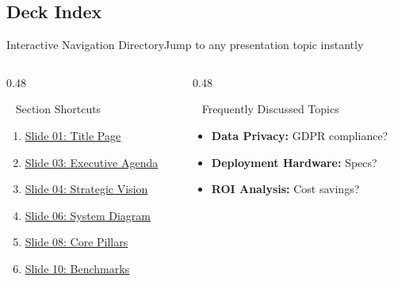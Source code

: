 \documentclass[aspectratio=169, 10pt]{beamer}
\newenvironment{compactitemize}{%
  \begin{itemize}%
    \setlength{\itemsep}{1pt}%
    \setlength{\parskip}{0pt}%
    \setlength{\parsep}{0pt}%
}{%
  \end{itemize}%
}
\begin{document}
\subsection{Deck Index}
\begin{frame}[label=deckindex]{Interactive Navigation Directory}{Jump to any presentation topic instantly}
  \begin{columns}[T]
    \begin{column}{0.48\textwidth}
      \begin{featurebox}{\faSitemap~ Section Shortcuts}
        \small
        \begin{enumerate}
          \item \hyperlink{titleframe}{\color{RoyalAccent} Slide 01: Title Page}
          \item \hyperlink{agenda}{\color{RoyalAccent} Slide 03: Executive Agenda}
          \item \hyperlink{sec:vision}{\color{RoyalAccent} Slide 04: Strategic Vision}
          \item \hyperlink{architecture}{\color{RoyalAccent} Slide 06: System Diagram}
          \item \hyperlink{sec:architecture}{\color{RoyalAccent} Slide 08: Core Pillars}
          \item \hyperlink{benchmarks}{\color{RoyalAccent} Slide 10: Benchmarks}
        \end{enumerate}
      \end{featurebox}
    \end{column}

    \begin{column}{0.48\textwidth}
      \begin{featurebox}{\faQuestionCircle~ Frequently Discussed Topics}
        \small
        \begin{compactitemize}
          \item \textbf{Data Privacy:} GDPR compliance?\\
                \hyperlink{sec:architecture}{}
          \vspace*{2pt}
          \item \textbf{Deployment Hardware:} Specs?\\
                \hyperlink{sec:deployment}{}
          \vspace*{2pt}
          \item \textbf{ROI Analysis:} Cost savings?\\
                \hyperlink{sec:deployment}{}
        \end{compactitemize}
      \end{featurebox}
    \end{column}
  \end{columns}
\end{frame}
\end{document}
